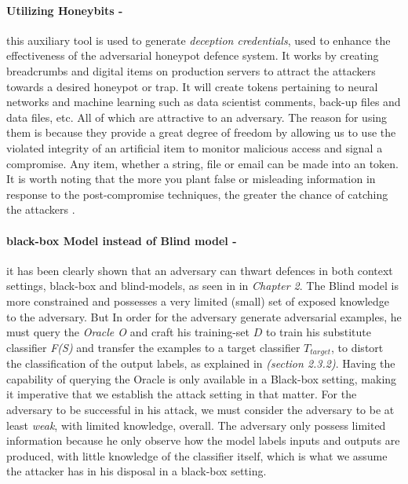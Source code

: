 \documentclass[grad,lot,lof,11pt,oneside,onehalfspace]{RUthesis}
\begin{document}
\paragraph{Utilizing Honeybits -} this auxiliary tool is used to generate \textit{deception credentials}, used to enhance the effectiveness of the adversarial honeypot defence system. It works by creating breadcrumbs and digital items on production servers to attract the attackers towards a desired honeypot or trap. It will create tokens pertaining to neural networks and machine learning such as data scientist comments, back-up files and data files, etc. All of which are attractive to an adversary. The reason for using them is because they provide a great degree of freedom by allowing us to use the violated integrity of an artificial item to monitor malicious access and signal a compromise. Any item, whether a string, file or email can be made into an token.  It is worth noting that the more you plant false or misleading information in response to the post-compromise techniques, the greater the chance of catching the attackers \cite{ka_honeybits:_2018}.

\paragraph{black-box Model instead of Blind model -} it has been clearly shown that an adversary can thwart defences in both context settings, black-box and blind-models, as seen in \cite{hosseini_blocking_2017}\cite{papernot_distillation_2016}\cite{carlini_defensive_nodate} in \textit{Chapter 2}. The Blind model is more constrained and possesses a very limited (small) set of exposed knowledge to the adversary. But In order for the adversary generate adversarial examples, he must query the \textit{Oracle O} and craft his training-set \textit{$D$} to train his substitute classifier \textit{F(S)} and transfer the examples to a target classifier \textit{$T_{target}$}, to distort the classification of the output labels, as explained in \textit{(section 2.3.2)}. Having the capability of querying the Oracle is only available in a Black-box setting, making it imperative that we establish the attack setting in that matter. For the adversary to be successful in his attack, we must consider the adversary to be at least \textit{weak}, with limited knowledge, overall. The adversary only possess limited information because he only observe how the model labels inputs and outputs are produced, with little knowledge of the classifier itself, which is what we assume the attacker has in his disposal in a black-box setting.
\end{document}
